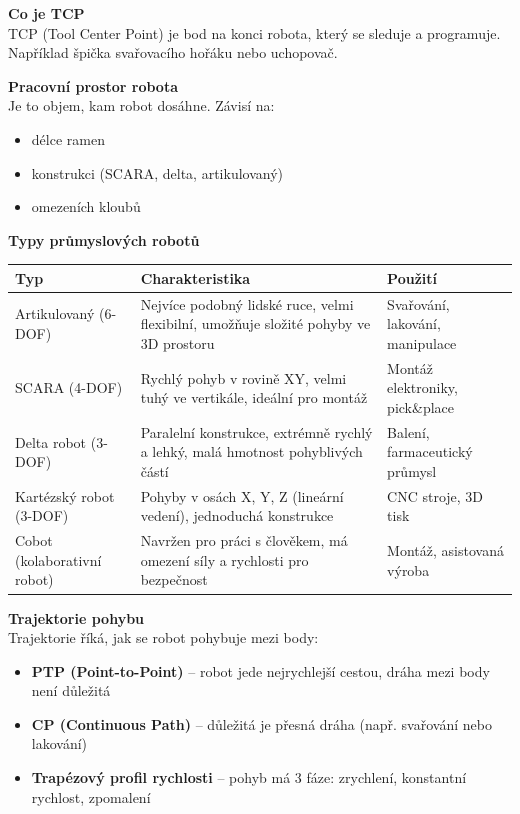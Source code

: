 \documentclass[a4paper,10pt]{article}
\begin{document}
\begin{vysvetlenibox}
\textbf{Co je TCP}\\
TCP (Tool Center Point) je bod na konci robota, který se sleduje
a programuje. Například špička svařovacího hořáku nebo uchopovač.

\textbf{Pracovní prostor robota}\\
Je to objem, kam robot dosáhne.
Závisí na:
\begin{itemize}[noitemsep]
    \item délce ramen
    \item konstrukci (SCARA, delta, artikulovaný)
    \item omezeních kloubů
\end{itemize}

\textbf{Typy průmyslových robotů}

\begin{center}
\begin{tabularx}{0.95\linewidth}{@{} l X l @{}}
\toprule
\textbf{Typ} & \textbf{Charakteristika} & \textbf{Použití} \\
\midrule

Artikulovaný (6-DOF) &
Nejvíce podobný lidské ruce, velmi flexibilní,
umožňuje složité pohyby ve 3D prostoru &
Svařování, lakování, manipulace \\

SCARA (4-DOF) &
Rychlý pohyb v rovině XY, velmi tuhý ve vertikále,
ideální pro montáž &
Montáž elektroniky, pick\&place \\

Delta robot (3-DOF) &
Paralelní konstrukce, extrémně rychlý a lehký,
malá hmotnost pohyblivých částí &
Balení, farmaceutický průmysl \\

Kartézský robot (3-DOF) &
Pohyby v osách X, Y, Z (lineární vedení),
jednoduchá konstrukce &
CNC stroje, 3D tisk \\

Cobot (kolaborativní robot) &
Navržen pro práci s člověkem,
má omezení síly a rychlosti pro bezpečnost &
Montáž, asistovaná výroba \\

\bottomrule
\end{tabularx}
\end{center}

\textbf{Trajektorie pohybu}\\
Trajektorie říká, jak se robot pohybuje mezi body:

\begin{itemize}[noitemsep, leftmargin=1.4em]
    \item \textbf{PTP (Point-to-Point)} -- robot jede nejrychlejší cestou,
    dráha mezi body není důležitá
    \item \textbf{CP (Continuous Path)} -- důležitá je přesná dráha
    (např. svařování nebo lakování)
    \item \textbf{Trapézový profil rychlosti} -- pohyb má 3 fáze:
    zrychlení, konstantní rychlost, zpomalení
\end{itemize}


\end{vysvetlenibox}
\end{document}
